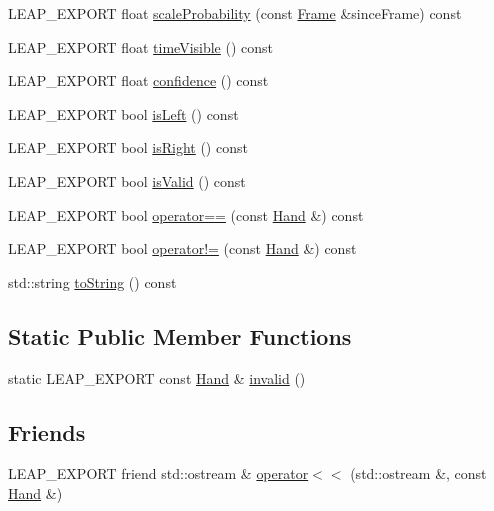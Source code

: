 \begin{DoxyCompactItemize}
L\+E\+A\+P\+\_\+\+E\+X\+P\+O\+RT float \hyperlink{class_leap_1_1_hand_a62e912199ab38b96702afd6eb63b34e0}{scale\+Probability} (const \hyperlink{class_leap_1_1_frame}{Frame} \&since\+Frame) const
\item 
L\+E\+A\+P\+\_\+\+E\+X\+P\+O\+RT float \hyperlink{class_leap_1_1_hand_aa0bfd236f2c3729ea8ae7081bcbc55b5}{time\+Visible} () const
\item 
L\+E\+A\+P\+\_\+\+E\+X\+P\+O\+RT float \hyperlink{class_leap_1_1_hand_ac28deea645d5e5119feccc05cf4dbbcf}{confidence} () const
\item 
L\+E\+A\+P\+\_\+\+E\+X\+P\+O\+RT bool \hyperlink{class_leap_1_1_hand_a97a82aa4c1ca8ef138fc8d9939b017d8}{is\+Left} () const
\item 
L\+E\+A\+P\+\_\+\+E\+X\+P\+O\+RT bool \hyperlink{class_leap_1_1_hand_aeff477c4cb80ac3fd7e76db4911c300a}{is\+Right} () const
\item 
L\+E\+A\+P\+\_\+\+E\+X\+P\+O\+RT bool \hyperlink{class_leap_1_1_hand_a596f55bc25a088c0a1760bbbca5ec2a8}{is\+Valid} () const
\item 
L\+E\+A\+P\+\_\+\+E\+X\+P\+O\+RT bool \hyperlink{class_leap_1_1_hand_a90a005182d02abd6ffef181d7d64f4a4}{operator==} (const \hyperlink{class_leap_1_1_hand}{Hand} \&) const
\item 
L\+E\+A\+P\+\_\+\+E\+X\+P\+O\+RT bool \hyperlink{class_leap_1_1_hand_ae837a29788bd93824e3de029eb67ce02}{operator!=} (const \hyperlink{class_leap_1_1_hand}{Hand} \&) const
\item 
std\+::string \hyperlink{class_leap_1_1_hand_aadce42e29675b791f85aa39056e7d585}{to\+String} () const
\end{DoxyCompactItemize}
\subsection*{Static Public Member Functions}
\begin{DoxyCompactItemize}
\item 
static L\+E\+A\+P\+\_\+\+E\+X\+P\+O\+RT const \hyperlink{class_leap_1_1_hand}{Hand} \& \hyperlink{class_leap_1_1_hand_ae66c7683d1c179cb3fa1913be320ea6a}{invalid} ()
\end{DoxyCompactItemize}
\subsection*{Friends}
\begin{DoxyCompactItemize}
\item 
L\+E\+A\+P\+\_\+\+E\+X\+P\+O\+RT friend std\+::ostream \& \hyperlink{class_leap_1_1_hand_a0b79e476fe0b74207a5d574c4ae4fe3d}{operator$<$$<$} (std\+::ostream \&, const \hyperlink{class_leap_1_1_hand}{Hand} \&)
\end{DoxyCompactItemize}
